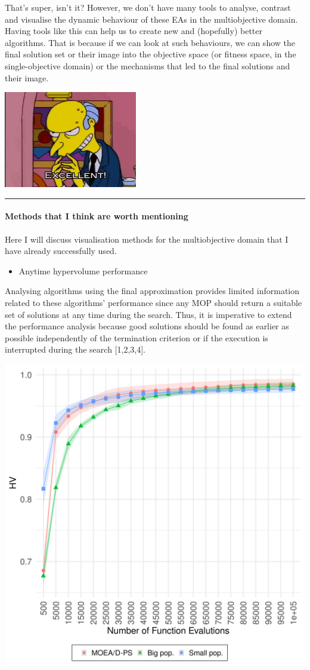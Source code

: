 \documentclass[
]{article}
\providecommand{\tightlist}{%
  \setlength{\itemsep}{0pt}\setlength{\parskip}{0pt}}
\begin{document}
That's super, isn't it? However, we don't have many tools to analyse,
contrast and visualise the dynamic behaviour of these EAs in the
multiobjective domain. Having tools like this can help us to create new
and (hopefully) better algorithms. That is because if we can look at
such behaviours, we can show the final solution set or their image into
the objective space (or fitness space, in the single-objective domain)
or the mechanisms that led to the final solutions and their image.

\begin{center}\includegraphics[width=0.4\linewidth]{gifs/thats_good} \end{center}

\begin{center}\rule{0.5\linewidth}{0.5pt}\end{center}

\hypertarget{methods-that-i-think-are-worth-mentioning}{%
\paragraph{Methods that I think are worth
mentioning}\label{methods-that-i-think-are-worth-mentioning}}

Here I will discuss visualisation methods for the multiobjective domain
that I have already successfully used.

\begin{itemize}
\tightlist
\item
  Anytime hypervolume performance
\end{itemize}

Analysing algorithms using the final approximation provides limited
information related to these algorithms' performance since any MOP
should return a suitable set of solutions at any time during the search.
Thus, it is imperative to extend the performance analysis because good
solutions should be found as earlier as possible independently of the
termination criterion or if the execution is interrupted during the
search {[}1,2,3,4{]}.

\begin{center}\includegraphics[width=0.45\linewidth]{imgs/UF10hv_evolution} \end{center}
\end{document}
